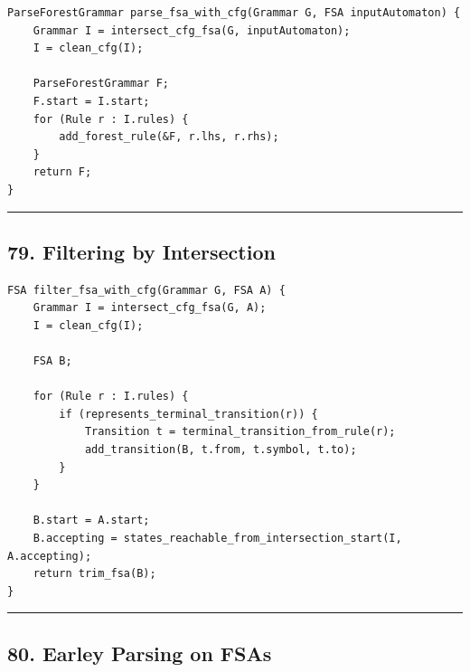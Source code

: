 \documentclass[10pt,letterpaper]{article}
\begin{document}
\begin{verbatim}
ParseForestGrammar parse_fsa_with_cfg(Grammar G, FSA inputAutomaton) {
    Grammar I = intersect_cfg_fsa(G, inputAutomaton);
    I = clean_cfg(I);

    ParseForestGrammar F;
    F.start = I.start;
    for (Rule r : I.rules) {
        add_forest_rule(&F, r.lhs, r.rhs);
    }
    return F;
}
\end{verbatim}

\medskip\hrule\medskip

\subsection*{79. Filtering by Intersection}

\begin{verbatim}
FSA filter_fsa_with_cfg(Grammar G, FSA A) {
    Grammar I = intersect_cfg_fsa(G, A);
    I = clean_cfg(I);

    FSA B;

    for (Rule r : I.rules) {
        if (represents_terminal_transition(r)) {
            Transition t = terminal_transition_from_rule(r);
            add_transition(B, t.from, t.symbol, t.to);
        }
    }

    B.start = A.start;
    B.accepting = states_reachable_from_intersection_start(I, A.accepting);
    return trim_fsa(B);
}
\end{verbatim}

\medskip\hrule\medskip

\subsection*{80. Earley Parsing on FSAs}
\end{document}
